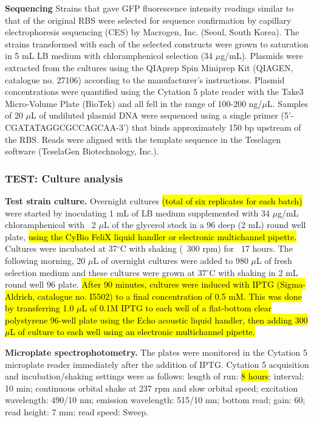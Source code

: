 \textbf{Sequencing}
Strains that gave GFP fluorescence intensity readings similar to that of the original RBS were selected for sequence confirmation by capillary electrophoresis sequencing (CES) by Macrogen, Inc. (Seoul, South Korea).
The strains transformed with each of the selected constructs were grown to saturation in 5 mL LB medium with chloramphenicol selection (34 $\mu$g/mL).
Plasmids were extracted from the cultures using the QIAprep Spin Miniprep Kit (QIAGEN, catalogue no. 27106) according to the manufacturer's instructions.
Plasmid concentrations were quantified using the Cytation 5 plate reader with the Take3 Micro-Volume Plate (BioTek) and all fell in the range of 100-200 ng/$\mu$L.
Samples of 20 $\mu$L of undiluted plasmid DNA were sequenced using a single primer (5'-CGATATAGGCGCCAGCAA-3') that binds approximately 150 bp upstream of the RBS.
Reads were aligned with the template sequence in the Teselagen software (TeselaGen Biotechnology, Inc.).

\subsubsection{TEST: Culture analysis}

\textbf{Test strain culture.}
Overnight cultures \hl{(total of six replicates for each batch)} were started by inoculating 1 mL of LB medium supplemented with 34 $\mu$g/mL chloramphenicol with ~2 $\mu$L of the glycerol stock in a 96 deep (2 mL) round well plate, \hl{using the CyBio FeliX liquid handler or electronic multichannel pipette.}
Cultures were incubated at 37$^{\circ}$C with shaking (~300 rpm) for ~17 hours.
The following morning, 20 $\mu$L of overnight cultures were added to 980 $\mu$L of fresh selection medium and these cultures were grown at 37$^{\circ}$C with shaking in 2 mL round well 96 plate.
\hl{After 90 minutes, cultures were induced with IPTG (Sigma-Aldrich, catalogue no. I5502) to a final concentration of 0.5 mM. This was done by transferring 1.0 $\mu$L of 0.1M IPTG to each well of a flat-bottom clear polystyrene 96-well plate using the Echo acoustic liquid handler, then adding 300 $\mu$L of culture to each well using an electronic multichannel pipette.}

\textbf{Microplate spectrophotometry.}
The plates were monitored in the Cytation 5 microplate reader immediately after the addition of IPTG.
Cytation 5 acquisition and incubation/shaking settings were as follows: length of run: \hl{8 hours}; interval: 10 min; continuous orbital shake at 237 rpm and slow orbital speed; excitation wavelength: 490/10 nm; emission wavelength: 515/10 nm; bottom read; gain: 60; read height: 7 mm; read speed: Sweep.

